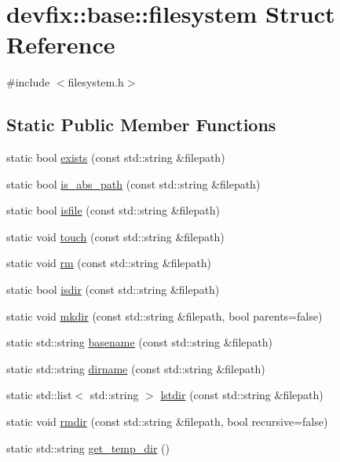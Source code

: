 \hypertarget{structdevfix_1_1base_1_1filesystem}{}\section{devfix\+:\+:base\+:\+:filesystem Struct Reference}
\label{structdevfix_1_1base_1_1filesystem}


{\ttfamily \#include $<$filesystem.\+h$>$}

\subsection*{Static Public Member Functions}
\begin{DoxyCompactItemize}
\item 
static bool \hyperlink{structdevfix_1_1base_1_1filesystem_a0b24e0dc385d1a6257adf3ece7830b7e}{exists} (const std\+::string \&filepath)
\item 
static bool \hyperlink{structdevfix_1_1base_1_1filesystem_ab83a752064650b62278367d58e12726a}{is\+\_\+abs\+\_\+path} (const std\+::string \&filepath)
\item 
static bool \hyperlink{structdevfix_1_1base_1_1filesystem_aaa31b2edd95e70979e3a932a21d28e59}{isfile} (const std\+::string \&filepath)
\item 
static void \hyperlink{structdevfix_1_1base_1_1filesystem_af0b0e1daa40b7d547983d4f70bb5e3b7}{touch} (const std\+::string \&filepath)
\item 
static void \hyperlink{structdevfix_1_1base_1_1filesystem_a120ab728ac1fc842a4897571de625f6b}{rm} (const std\+::string \&filepath)
\item 
static bool \hyperlink{structdevfix_1_1base_1_1filesystem_a847752381fcd24c3fea6802b04cad5c6}{isdir} (const std\+::string \&filepath)
\item 
static void \hyperlink{structdevfix_1_1base_1_1filesystem_aabb99229325d7aafdefe857ba7317aac}{mkdir} (const std\+::string \&filepath, bool parents=false)
\item 
static std\+::string \hyperlink{structdevfix_1_1base_1_1filesystem_a93c1a012676ba19073545d6fd59d6ac3}{basename} (const std\+::string \&filepath)
\item 
static std\+::string \hyperlink{structdevfix_1_1base_1_1filesystem_a4eda25bbce0188a5b2e9899a054e0854}{dirname} (const std\+::string \&filepath)
\item 
static std\+::list$<$ std\+::string $>$ \hyperlink{structdevfix_1_1base_1_1filesystem_a6e922f4a97bb814d002ce058506edfec}{lstdir} (const std\+::string \&filepath)
\item 
static void \hyperlink{structdevfix_1_1base_1_1filesystem_ac0256430ab57a86e73b01695a8bff8b8}{rmdir} (const std\+::string \&filepath, bool recursive=false)
\item 
static std\+::string \hyperlink{structdevfix_1_1base_1_1filesystem_a2f824476266362a1a98f3f762624a7ae}{get\+\_\+temp\+\_\+dir} ()
\end{DoxyCompactItemize}
